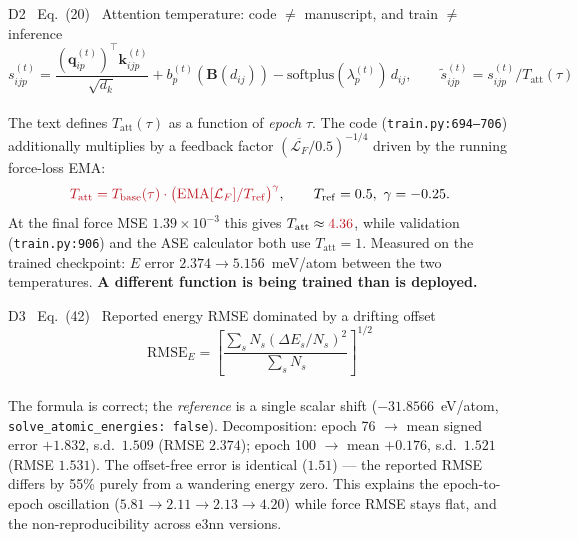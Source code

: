 \documentclass[10pt,a4paper]{article}
\newcommand{\BAD}[1]{\textcolor{BADred}{#1}}
\newcommand{\code}[1]{\texttt{\small #1}}
\begin{document}
\begin{badbox}{D2 \ Eq.~(20) \ Attention temperature: code $\neq$ manuscript, and train $\neq$ inference}
\vspace{-6pt}
\begin{equation*}
s^{(t)}_{ijp} = \frac{(\bm q^{(t)}_{ip})^{\!\top}\bm k^{(t)}_{ijp}}{\sqrt{d_k}}
+ b^{(t)}_p(\bm B(d_{ij})) - \mathrm{softplus}(\lambda^{(t)}_p)\,d_{ij},
\qquad \tilde s^{(t)}_{ijp} = s^{(t)}_{ijp}/T_{\mathrm{att}}(\tau)
\end{equation*}
\vspace{-8pt}\\
\footnotesize
The text defines $T_{\mathrm{att}}(\tau)$ as a function of \emph{epoch} $\tau$. The code
(\code{train.py:694--706}) additionally multiplies by a feedback factor
$\left(\overline{\mathcal L_F}/0.5\right)^{-1/4}$ driven by the running force-loss EMA:
\[
\BAD{T_{\mathrm{att}} = T_{\mathrm{base}}(\tau)\cdot\big(\mathrm{EMA}[\mathcal L_F]/T_{\mathrm{ref}}\big)^{\gamma}},
\qquad T_{\mathrm{ref}}=0.5,\ \gamma=-0.25 .
\]
At the final force MSE $1.39\times10^{-3}$ this gives $T_{\mathrm{att}}\approx\BAD{4.36}$, while
validation (\code{train.py:906}) and the ASE calculator both use $T_{\mathrm{att}}=1$.
Measured on the trained checkpoint: $E$ error $2.374\to5.156$~meV/atom between the two
temperatures. \textbf{A different function is being trained than is deployed.}
\end{badbox}

\begin{badbox}{D3 \ Eq.~(42) \ Reported energy RMSE dominated by a drifting offset}
\vspace{-6pt}
\begin{equation*}
\mathrm{RMSE}_E = \left[\frac{\sum_s N_s(\Delta E_s/N_s)^2}{\sum_s N_s}\right]^{1/2}
\end{equation*}
\vspace{-8pt}\\
\footnotesize
The formula is correct; the \emph{reference} is a single scalar shift
($-31.8566$~eV/atom, \code{solve\_atomic\_energies: false}). Decomposition:
epoch 76 $\to$ mean signed error $+1.832$, s.d.\ $1.509$ (RMSE $2.374$);
epoch 100 $\to$ mean $+0.176$, s.d.\ $1.521$ (RMSE $1.531$).
\BAD{The offset-free error is identical ($1.51$) --- the reported RMSE differs by 55\%
purely from a wandering energy zero.} This explains the epoch-to-epoch oscillation
($5.81\to2.11\to2.13\to4.20$) while force RMSE stays flat, and the non-reproducibility
across e3nn versions.
\end{badbox}
\end{document}
